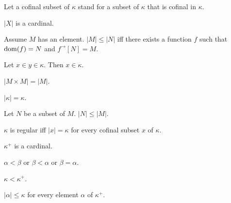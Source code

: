\documentclass{article}
\newcommand{\Prod}[2]{#1\times #2}
\newcommand{\Succ}[1]{#1^{+}}
\newcommand{\image}[2]{#1^{\to}[#2]}
\newcommand{\card}[1]{\left|#1\right|}
\begin{document}
\begin{forthel}
    Let a cofinal subset of $\kappa$ stand for a subset of $\kappa$ that is cofinal in $\kappa$.

    \begin{signature}[Cardinality]
      $\card{X}$ is a cardinal.
    \end{signature}

    \begin{axiom}
      Assume $M$ has an element.
      $\card{M} \leq \card{N}$ iff there exists a function $f$ such that $\operatorname{dom}(f) = N$ and $\image{f}{N} = M$.
    \end{axiom}

    \begin{axiom}[Transitivity]
      Let $x\in y\in \kappa$.
      Then $x\in \kappa$.
    \end{axiom}

    \begin{axiom}
      $\card{\Prod{M}{M}} = \card{M}$.
    \end{axiom}

    \begin{axiom}
      $\card{\kappa} = \kappa$.
    \end{axiom}

    \begin{axiom}
      Let $N$ be a subset of $M$. $\card{N} \leq \card{M}$.
    \end{axiom}

    \begin{definition}
      $\kappa$ is regular iff $\card{x} = \kappa$ for every cofinal subset $x$ of $\kappa$.
    \end{definition}

    \begin{signature}
      $\Succ{\kappa}$ is a cardinal.
    \end{signature}

    \begin{axiom}
      $\alpha < \beta$ or $\beta < \alpha$ or $\beta = \alpha$.
    \end{axiom}

    \begin{axiom}
      $\kappa < \Succ{\kappa}$.
    \end{axiom}

    \begin{axiom}
      $\card{\alpha} \leq \kappa$ for every element $\alpha$ of $\Succ{\kappa}$.
    \end{axiom}


\end{forthel}
\end{document}
